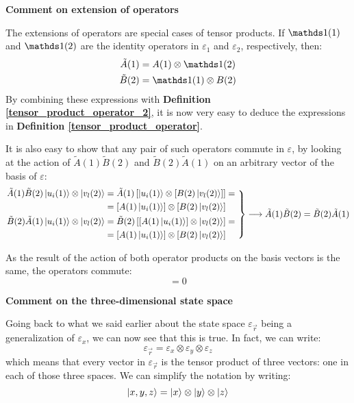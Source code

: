 \textbf{Comment on extension of operators} 

The extensions of operators are special cases of tensor products. If $\Imat(1)$ and $\Imat(2)$ are the identity operators in $\varepsilon_1$ and $\varepsilon_2$, respectively, then:
\begin{equation}
    \begin{split}
        \tilde{A}(1) &= A(1)\otimes \Imat(2)\\
        \tilde{B}(2) &= \Imat(1)\otimes B(2)
    \end{split}
\end{equation}
By combining these expressions with \textbf{Definition \ref{tensor_product_operator_2}}, it is now very easy to deduce the expressions in \textbf{Definition \ref{tensor_product_operator}}.

It is also easy to show that any pair of such operators commute in $\varepsilon$, by looking at the action of $\tilde{A}(1)\tilde{B}(2)$ and $\tilde{B}(2)\tilde{A}(1)$ on an arbitrary vector of the basis of $\varepsilon$:
\begin{equation}
    \left.
        \begin{split}
            \tilde{A}(1)\tilde{B}(2)\ket{u_i(1)}\otimes\ket{v_l(2)} &= \tilde{A}(1)\left[\ket{u_i(1)}\otimes\left[B(2)\ket{v_l(2)}\right]\right] =\\
            &= \left[A(1)\ket{u_i(1)}\right]\otimes\left[B(2)\ket{v_l(2)}\right] \\
            \tilde{B}(2)\tilde{A}(1)\ket{u_i(1)}\otimes\ket{v_l(2)} &= \tilde{B}(2)\left[\left[A(1)\ket{u_i(1)}\right]\otimes\ket{v_l(2)}\right] =\\
            &= \left[A(1)\ket{u_i(1)}\right]\otimes\left[B(2)\ket{v_l(2)}\right]
        \end{split}
    \ \right\} \longrightarrow \tilde{A}(1)\tilde{B}(2) = \tilde{B}(2)\tilde{A}(1)
\end{equation}

As the result of the action of both operator products on the basis vectors is the same, the operators commute:
\begin{equation}
    [\tilde{A}(1), \tilde{B}(2)] = 0
\end{equation}

\textbf{Comment on the three-dimensional state space}

Going back to what we said earlier about the state space $\varepsilon_{\vec{r}}$ being a generalization of $\varepsilon_x$, we can now see that this is true. In fact, we can write:
\begin{equation}
    \varepsilon_{\vec{r}} = \varepsilon_x \otimes \varepsilon_y \otimes \varepsilon_z
\end{equation}
which means that every vector in $\varepsilon_{\vec{r}}$ is the tensor product of three vectors: one in each of those three spaces. We can simplify the notation by writing:
\begin{equation}
    \ket{x, y, z} = \ket{x}\otimes\ket{y}\otimes\ket{z}
\end{equation}

